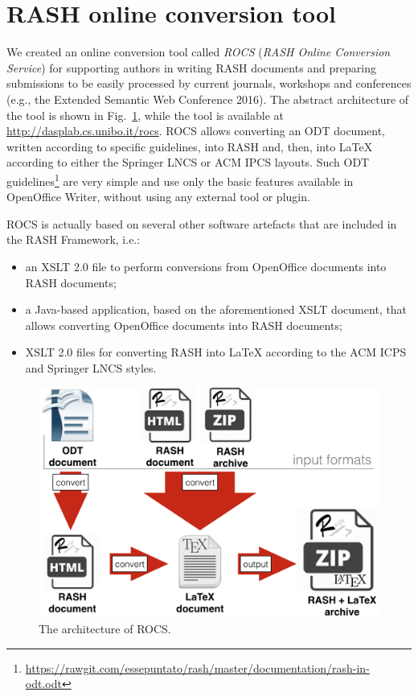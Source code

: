 \documentclass{sig-alternate}
\makeatletter
\def\maxwidth#1{\ifdim\Gin@nat@width>#1 #1\else\Gin@nat@width\fi}
\makeatother
\begin{document}
\section{RASH online conversion tool}\label{__RefHeading__2265_824787510}

We created an online conversion tool called {\em ROCS} ({\em RASH Online Conversion Service}) for supporting authors in writing RASH documents and preparing submissions to be easily processed by current journals, workshops and conferences (e.g., the Extended Semantic Web Conference 2016). The abstract architecture of the tool is shown in Fig.~\ref{refIllustration0}, while the tool is available at \url{http://dasplab.cs.unibo.it/rocs}. ROCS allows converting an ODT document, written according to specific guidelines, into RASH and, then, into LaTeX according to either the Springer LNCS or ACM IPCS layouts. Such ODT guidelines\footnote{\url{https://rawgit.com/essepuntato/rash/master/documentation/rash-in-odt.odt}} are very simple and use only the basic features available in OpenOffice Writer, without using any external tool or plugin.

ROCS is actually based on several other software artefacts that are included in the RASH Framework, i.e.:
\begin{itemize}
\item an XSLT 2.0 file to perform conversions from OpenOffice documents into RASH documents;
\item a Java-based application, based on the aforementioned XSLT document, that allows converting OpenOffice documents into RASH documents;
\item XSLT 2.0 files for converting RASH into LaTeX according to the ACM ICPS and Springer LNCS styles.
\end{itemize}
\begin{figure}[h!]
\centering
\includegraphics[width=\maxwidth{0.7\columnwidth}]{img/100002010000048C000003124922A012.png}
\caption{The architecture of ROCS.}
\label{refIllustration0}
\end{figure}
\end{document}
